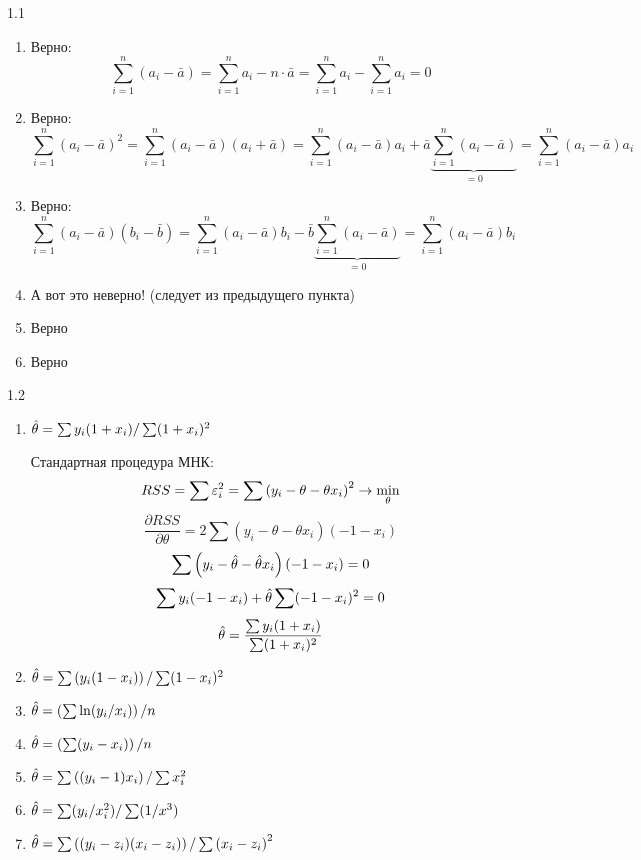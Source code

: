 \protect \hypertarget {soln:1.1}{}
\begin{solution}{{1.1}}
\begin{enumerate}
\item Верно: \[\sum_{i=1}^{n}(a_i-\bar{a}) = \sum_{i=1}^{n}a_i - n\cdot\bar{a} = \sum_{i=1}^{n}a_i - \sum_{i=1}^{n}a_i = 0\]
\item Верно: \[\sum_{i=1}^{n}(a_i-\bar{a})^2 = \sum_{i=1}^{n}(a_i-\bar{a})(a_i+\bar{a}) = \sum_{i=1}^{n}(a_i-\bar{a})a_i + \bar{a}\underbrace{\sum_{i=1}^{n}(a_i-\bar{a})}_{=0} = \sum_{i=1}^{n}(a_i-\bar{a})a_i \]

\item Верно: \[\sum_{i=1}^{n}(a_i-\bar{a})(b_i-\bar{b}) = \sum_{i=1}^{n}(a_i-\bar{a})b_i - \bar{b}\underbrace{\sum_{i=1}^{n}(a_i-\bar{a})}_{=0} = \sum_{i=1}^{n}(a_i-\bar{a})b_i \]
\item А вот это неверно! (следует из предыдущего пункта)
\item Верно
\item Верно
\end{enumerate}
\end{solution}
\protect \hypertarget {soln:1.2}{}
\begin{solution}{{1.2}}
\begin{enumerate}
\item \(\hat{\theta} = \sum y_i (1 + x_i) / \sum (1 + x_i)^2\)

Стандартная процедура МНК:
\[RSS = \sum \varepsilon_i^2 = \sum \left(y_i - \theta - \theta x_i\right)^2 \rightarrow \min \limits_\theta\]
\[\frac{\partial RSS}{\partial \theta} = 2 \sum \left(y_i - \theta - \theta x_i\right)(-1 - x_i) \]
\[\sum \left(y_i - \hat{\theta} - \hat{\theta} x_i\right)(-1 - x_i) = 0\]
\[\sum y_i (-1 - x_i) + \hat{\theta} \sum (-1 - x_i)^2 = 0 \]
\[\hat{\theta} = \frac{\sum y_i (1 + x_i)}{\sum (1 + x_i)^2} \]

\item \(\hat{\theta} = \sum \left(y_i (1 - x_i)\right) / \sum (1 - x_i)^2\)

\item \(\hat{\theta} = \left( \sum \ln (y_i / x_i) \right) / n \)

\item \(\hat{\theta} = \left( \sum (y_i - x_i) \right) / n \)

\item \(\hat{\theta} = \sum \left((y_i - 1) x_i\right) / \sum x_i^2\)

\item \(\hat{\theta} = \sum (y_i / x_i^2) / \sum (1 /x^3)\)

\item \(\hat{\theta} = \sum \left((y_i - z_i)(x_i - z_i) \right) / \sum \left(x_i - z_i\right)^2 \)

\end{enumerate}
\end{solution}
